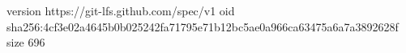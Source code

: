 version https://git-lfs.github.com/spec/v1
oid sha256:4cf3e02a4645b0b025242fa71795e71b12bc5ae0a966ca63475a6a7a3892628f
size 696
